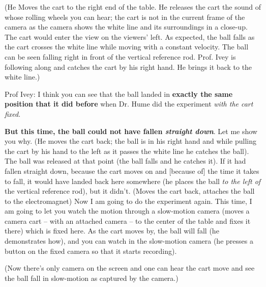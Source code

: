 \documentclass[a6paper]{article}
\begin{document}
(He Moves the cart to the right end of the table. He releases the cart the sound of whose rolling wheels you can hear; the cart is not in the current frame of the camera as the camera shows the white line and its surroundings in a close-up. The cart would enter the view on the viewers' left. As expected, the ball falls as the cart crosses the white line while moving with a constant velocity. The ball can be seen falling right in front of the vertical reference rod. Prof. Ivey is following along and catches the cart by his right hand. He brings it back to the white line.)

Prof Ivey: I think you can see that the ball landed in \textbf{exactly the same position that it did before} when Dr. Hume did the experiment \emph{with the cart fixed}.

\textbf{But this time, the ball could not have fallen \emph{straight down}}. Let me show you why. (He moves the cart back; the ball is in his right hand and while pulling the cart by his hand to the left as it passes the white line he catches the ball). The ball was released at that point (the ball falls and he catches it). If it had fallen straight down, because the cart moves on and [because of] the time it takes to fall, it would have landed back here somewhere (he places the ball \emph{to the left of} the vertical reference rod), but it didn't. (Moves the cart back, attaches the ball to the electromagnet) Now I am going to do the experiment again. This time, I am going to let you watch the motion through a slow-motion camera (moves a camera cart -- with an attached camera -- to the center of the table and fixes it there) which is fixed here. As the cart moves by, the ball will fall (he demonstrates how), and you can watch in the slow-motion camera (he presses a button on the fixed camera so that it starts recording).

(Now there's only camera on the screen and one can hear the cart move and see the ball fall in slow-motion as captured by the camera.)
\end{document}
